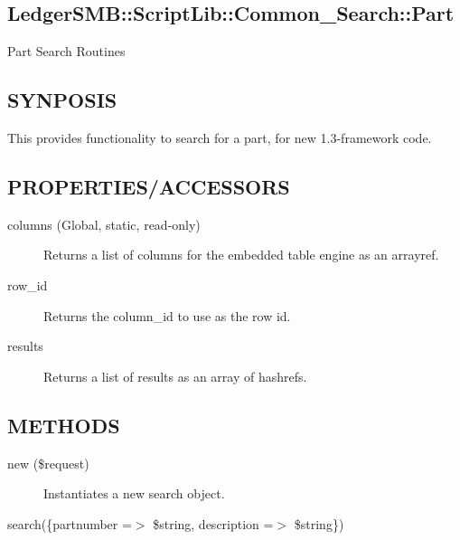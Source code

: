 \begin{description}
\section{LedgerSMB::ScriptLib::Common\_Search::Part\label{LedgerSMB::ScriptLib::Common_Search::Part}}


Part Search Routines

\subsection*{SYNPOSIS\label{LedgerSMB::ScriptLib::Common_Search::Part_SYNPOSIS}}


This provides functionality to search for a part, for new 1.3-framework code.

\subsection*{PROPERTIES/ACCESSORS\label{LedgerSMB::ScriptLib::Common_Search::Part_PROPERTIES_ACCESSORS}}
\begin{description}

\item[{columns (Global, static, read-only)}] \mbox{}

Returns a list of columns for the embedded table engine as an arrayref.


\item[{row\_id}] \mbox{}

Returns the column\_id to use as the row id.


\item[{results}] \mbox{}

Returns a list of results as an array of hashrefs.

\end{description}
\subsection*{METHODS\label{LedgerSMB::ScriptLib::Common_Search::Part_METHODS}}
\begin{description}

\item[{new (\$request)}] \mbox{}

Instantiates a new search object.


\item[{search(\{partnumber =$>$ \$string, description =$>$ \$string\})}] \mbox{}


\end{description}
\end{description}
